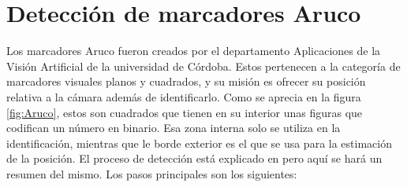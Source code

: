 \section{Detección de marcadores Aruco} \label{sec:detectAruco}
	Los marcadores Aruco fueron creados por el departamento Aplicaciones de la Visión Artificial de la universidad de Córdoba. Estos pertenecen a la categoría de marcadores visuales planos y cuadrados, y su misión es ofrecer su posición relativa a la cámara además de identificarlo. 
	Como se aprecia en la figura \ref{fig:Aruco}, estos son cuadrados que tienen en su interior unas figuras que codifican un número en binario. Esa zona interna solo se utiliza en la identificación, mientras que le borde exterior es el que se usa para la estimación de la posición. El proceso de detección está explicado en \cite{aruco2014} pero aquí se hará un resumen del mismo. Los pasos principales son los siguientes:
\figAruco
